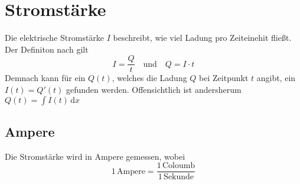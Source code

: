 \documentclass{article}
\begin{document}
 
\section{Stromstärke} 
Die elektrische Stromstärke $I$ beschreibt, wie viel Ladung pro Zeiteinehit fließt. Der Definiton nach gilt
\[
 I = \frac{Q}{t}
 \quad \text{und} \quad
 Q = I \cdot t 
\]
Demnach kann für ein $Q(t)$, welches die Ladung $Q$ bei Zeitpunkt $t$ angibt, ein $I(t)=Q'(t)$ gefunden werden. Offensichtlich ist andersherum $\displaystyle Q(t) = \int I(t) \,\mathrm{d}x$
 
\subsection{Ampere} 
Die Stromstärke wird in Ampere gemessen, wobei
\[
 1 \, \text{Ampere} = \frac{1 \, \text{Coloumb}}{1 \, \text{Sekunde}}
\] 
 
\end{document}
